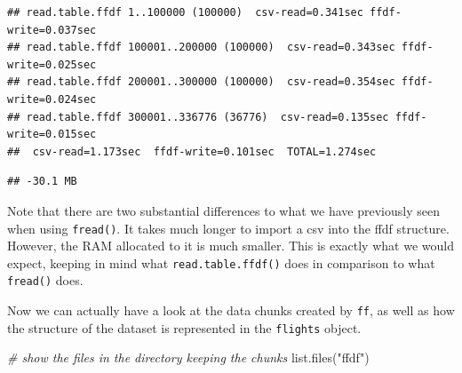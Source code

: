 \documentclass[
  12pt,
]{style/krantz}
\newenvironment{Shaded}{\begin{snugshade}}{\end{snugshade}}
\newcommand{\CommentTok}[1]{\textcolor[rgb]{0.56,0.35,0.01}{\textit{#1}}}
\newcommand{\FunctionTok}[1]{\textcolor[rgb]{0.00,0.00,0.00}{#1}}
\newcommand{\NormalTok}[1]{#1}
\newcommand{\StringTok}[1]{\textcolor[rgb]{0.31,0.60,0.02}{#1}}
\begin{document}
\begin{verbatim}
## read.table.ffdf 1..100000 (100000)  csv-read=0.341sec ffdf-write=0.037sec
## read.table.ffdf 100001..200000 (100000)  csv-read=0.343sec ffdf-write=0.025sec
## read.table.ffdf 200001..300000 (100000)  csv-read=0.354sec ffdf-write=0.024sec
## read.table.ffdf 300001..336776 (36776)  csv-read=0.135sec ffdf-write=0.015sec
##  csv-read=1.173sec  ffdf-write=0.101sec  TOTAL=1.274sec
\end{verbatim}

\begin{verbatim}
## -30.1 MB
\end{verbatim}

Note that there are two substantial differences to what we have previously seen when using \texttt{fread()}. It takes much longer to import a csv into the ffdf structure. However, the RAM allocated to it is much smaller. This is exactly what we would expect, keeping in mind what \texttt{read.table.ffdf()} does in comparison to what \texttt{fread()} does.

Now we can actually have a look at the data chunks created by \texttt{ff}, as well as how the structure of the dataset is represented in the \texttt{flights} object.

\begin{Shaded}
\begin{Highlighting}[]
\CommentTok{\# show the files in the directory keeping the chunks}
\FunctionTok{list.files}\NormalTok{(}\StringTok{"ffdf"}\NormalTok{)}
\end{Highlighting}
\end{Shaded}
\end{document}
